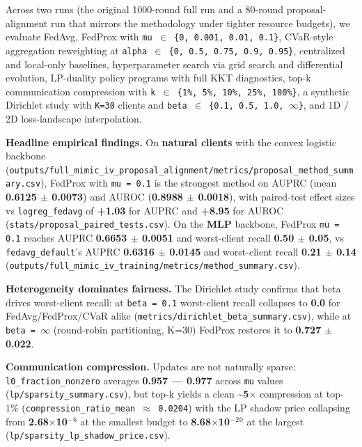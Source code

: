 \documentclass{article}
\begin{document}
Across two runs (the original 1000-round full run and a 80-round proposal-alignment run that mirrors the methodology under tighter resource budgets), we evaluate FedAvg, FedProx with \texttt{mu \ensuremath{\in} \{0, 0.001, 0.01, 0.1\}}, CVaR-style aggregation reweighting at \texttt{alpha \ensuremath{\in} \{0, 0.5, 0.75, 0.9, 0.95\}}, centralized and local-only baselines, hyperparameter search via grid search and differential evolution, LP-duality policy programs with full KKT diagnostics, top-k communication compression with \texttt{k \ensuremath{\in} \{1\%, 5\%, 10\%, 25\%, 100\%\}}, a synthetic Dirichlet study with \texttt{K=30} clients and \texttt{beta \ensuremath{\in} \{0.1, 0.5, 1.0, \ensuremath{\infty}\}}, and 1D / 2D loss-landscape interpolation.


\textbf{Headline empirical findings.} On \textbf{natural clients} with the convex logistic backbone (\texttt{outputs/full\_mimic\_iv\_proposal\_alignment/metrics/proposal\_method\_summary.csv}), FedProx with \texttt{mu = 0.1} is the strongest method on AUPRC (mean \textbf{0.6125 \ensuremath{\pm} 0.0073}) and AUROC (\textbf{0.8988 \ensuremath{\pm} 0.0018}), with paired-test effect sizes vs \texttt{logreg\_fedavg} of \textbf{+1.03} for AUPRC and \textbf{+8.95} for AUROC (\texttt{stats/proposal\_paired\_tests.csv}). On the \textbf{MLP} backbone, FedProx \texttt{mu = 0.1} reaches AUPRC \textbf{0.6653 \ensuremath{\pm} 0.0051} and worst-client recall \textbf{0.50 \ensuremath{\pm} 0.05}, vs \texttt{fedavg\_default}'s AUPRC \textbf{0.6316 \ensuremath{\pm} 0.0145} and worst-client recall \textbf{0.21 \ensuremath{\pm} 0.14} (\texttt{outputs/full\_mimic\_iv\_training/metrics/method\_summary.csv}).


\textbf{Heterogeneity dominates fairness.} The Dirichlet study confirms that beta drives worst-client recall: at \texttt{beta = 0.1} worst-client recall collapses to \textbf{0.0} for FedAvg/FedProx/CVaR alike (\texttt{metrics/dirichlet\_beta\_summary.csv}), while at \texttt{beta = \ensuremath{\infty}} (round-robin partitioning, K=30) FedProx restores it to \textbf{0.727 \ensuremath{\pm} 0.022}.


\textbf{Communication compression.} Updates are not naturally sparse: \texttt{l0\_fraction\_nonzero} averages \textbf{0.957 --- 0.977} across \texttt{mu} values (\texttt{lp/sparsity\_summary.csv}), but top-k yields a clean \textbf{\textasciitilde{}5\ensuremath{\times}} compression at top-1\% (\texttt{compression\_ratio\_mean \ensuremath{\approx} 0.0204}) with the LP shadow price collapsing from \textbf{2.68\ensuremath{\times}10\ensuremath{^{-}}\ensuremath{^{6}}} at the smallest budget to \textbf{8.68\ensuremath{\times}10\ensuremath{^{-}}\ensuremath{^{2}}\ensuremath{^{0}}} at the largest (\texttt{lp/sparsity\_lp\_shadow\_price.csv}).
\end{document}
